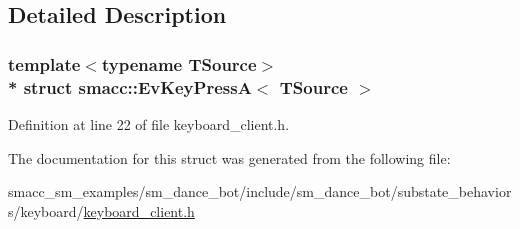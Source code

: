 \subsection{Detailed Description}
\subsubsection*{template$<$typename T\+Source$>$\\*
struct smacc\+::\+Ev\+Key\+Press\+A$<$ T\+Source $>$}



Definition at line 22 of file keyboard\+\_\+client.\+h.



The documentation for this struct was generated from the following file\+:\begin{DoxyCompactItemize}
\item 
smacc\+\_\+sm\+\_\+examples/sm\+\_\+dance\+\_\+bot/include/sm\+\_\+dance\+\_\+bot/substate\+\_\+behaviors/keyboard/\hyperlink{keyboard__client_8h}{keyboard\+\_\+client.\+h}\end{DoxyCompactItemize}
